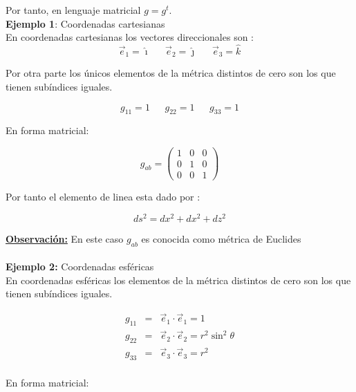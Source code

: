 \documentclass[12pt]{report}
\begin{document}
Por tanto, en lenguaje matricial  $g=g^t$.
\\





\textbf{Ejemplo 1}: Coordenadas cartesianas \\


En coordenadas cartesianas los vectores direccionales son : \\

 \begin{equation}
 \nonumber 
 \vec{e}_1 = \hat{\imath}  \ \ \ \ \ \ \  \vec{e}_2 = \hat{\jmath}  \ \ \ \ \ \ \ \vec{e}_3 = \hat{k}
 \end{equation}

Por otra parte los únicos elementos de la métrica distintos de cero son los que tienen subíndices iguales.

\begin{equation}
\nonumber
g_{11}=1 \ \ \ \ \ \ \ g_{22}=1 \ \ \ \ \ \ \ g_{33}=1
\end{equation}

En forma matricial:


\[ g_{ab} =
\left( \begin{array}{cccc} 
 1 & 0 & 0  \\ 
 0 & 1 & 0  \\
 0 & 0 & 1  
\end{array} \right) \]

Por tanto el elemento de linea esta dado por :

\begin{equation}
ds^2= dx^2 + dx^2 + dz^2
\end{equation}

\textbf{\underline{Observación:}} En este caso $g_{ab}$ es conocida como métrica de Euclides
\\
\\

\textbf{Ejemplo 2:} Coordenadas esféricas \\


En coordenadas esféricas los elementos de la métrica distintos de cero son los que tienen subíndices iguales.

\begin{eqnarray} 
g_{11}&=& \vec{e}_1 \cdot \vec{e}_1 = 1 \nonumber \\
g_{22}&=& \vec{e}_2 \cdot \vec{e}_2 = r^2 \sin ^2\theta \nonumber \\
g_{33}&=& \vec{e}_3 \cdot \vec{e}_3 = r^2 \nonumber
\end{eqnarray}
\\
En forma matricial:
\end{document}
